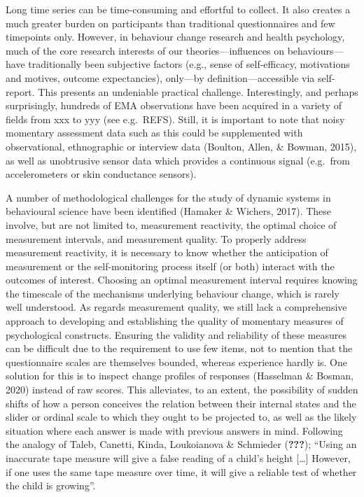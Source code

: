 \documentclass[
  british,
  man,floatsintext]{apa6}
\begin{document}
Long time series can be time-consuming and effortful to collect. It also creates a much greater burden on participants than traditional questionnaires and few timepoints only. However, in behaviour change research and health psychology, much of the core research interests of our theories---influences on behaviours---have traditionally been subjective factors (e.g., sense of self-efficacy, motivations and motives, outcome expectancies), only---by definition---accessible via self-report. This presents an undeniable practical challenge. Interestingly, and perhaps surprisingly, hundreds of EMA observations have been acquired in a variety of fields from xxx to yyy (see e.g.~REFS). Still, it is important to note that noisy momentary assessment data such as this could be supplemented with observational, ethnographic or interview data (Boulton, Allen, \& Bowman, 2015), as well as unobtrusive sensor data which provides a continuous signal (e.g.~from accelerometers or skin conductance sensors).

A number of methodological challenges for the study of dynamic systems in behavioural science have been identified (Hamaker \& Wichers, 2017). These involve, but are not limited to, measurement reactivity, the optimal choice of measurement intervals, and measurement quality. To properly address measurement reactivity, it is necessary to know whether the anticipation of measurement or the self-monitoring process itself (or both) interact with the outcomes of interest. Choosing an optimal measurement interval requires knowing the timescale of the mechanisms underlying behaviour change, which is rarely well understood. As regards measurement quality, we still lack a comprehensive approach to developing and establishing the quality of momentary measures of psychological constructs. Ensuring the validity and reliability of these measures can be difficult due to the requirement to use few items, not to mention that the questionnaire scales are themselves bounded, whereas experience hardly is. One solution for this is to inspect change profiles of responses (Hasselman \& Bosman, 2020) instead of raw scores. This alleviates, to an extent, the possibility of sudden shifts of how a person conceives the relation between their internal states and the slider or ordinal scale to which they ought to be projected to, as well as the likely situation where each answer is made with previous answers in mind. Following the analogy of Taleb, Canetti, Kinda, Loukoianova \& Schmieder ({\textbf{???}}); \enquote{Using an inaccurate tape measure will give a false reading of a child's height {[}\ldots{]} However, if one uses the same tape measure over time, it will give a reliable test of whether the child is growing}.
\end{document}
